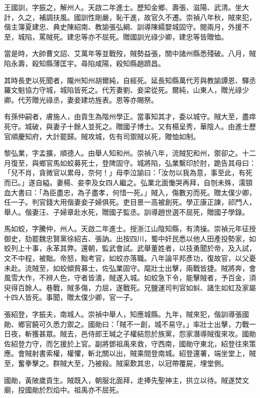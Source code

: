 \begin{pinyinscope}
王國訓，字振之，解州人。天啟二年進士。歷知金鄉、壽張、滋陽、武清。坐大計，久之，補調扶風。國訓性剛嚴，恥干進，故官久不遷。崇禎八年秋，賊來犯，偕主簿夏建忠、典史陳紹南、教諭張弘綱、訓導陳繻嬰城固守。閱兩月，外援不至，城陷，罵賊死。建忠等亦不屈死。贈國訓光祿少卿，建忠等皆贈恤。

當是時，大帥曹文詔、艾萬年等並戰歿，賊勢益張，關中諸州縣悉殘破。八月，賊陷永壽，殺知縣薄匡宇。尋陷咸陽，殺知縣趙躋昌。

其時長吏以死聞者，隴州知州胡爾純，自經死。延長知縣萬代芳與教諭譚恩、驛丞羅文魁協力守城，城陷皆死之。代芳妻劉、妾梁從死。爾純，山東人，贈光祿少卿。代芳贈光祿丞，妻妾建坊旌表。恩等亦賜祭。

有孫仲嗣者，膚施人，由貢生為階州學正。當事知其才，委以城守。賊大至，盡瘁死守。城破，與妻子十餘人並死之。贈國子博士。又有楊呈秀，華陰人。由進士歷官順慶知府，大計罷歸。賊攻城，佐有司禦賊以死，贈恤如制。

黎弘業，字孟擴，順德人。由舉人知和州。崇禎八年，流賊犯和州，禦卻之。十二月復至，與鄉官馬如蛟募死士，登陴固守。城將陷，弘業繫印於肘，跪告其母曰：「兒不肖，貪微官以累母，奈何！」母李泣諭曰：「汝勿以我為意，事至此，有死而已。」遂自縊。妻楊、妾李及女四人繼之。弘業北面慟哭再拜，自刎未殊，濡頸血大書曰：「為臣盡忠，為子盡孝，何惜一死。」賊入，傷數刃而死。贈太僕少卿，任一子。判官錢大用偕妻妾子婦俱死。吏目景一高被創死。學正康正諫，祁門人，舉人。偕妻汪、子婦章赴水死，贈國子監丞。訓導趙世選不屈死，贈國子學錄。

馬如蛟，字騰仲，州人。天啟二年進士。授浙江山陰知縣，有清操。崇禎元年征授御史，劾罷魏忠賢黨徐紹吉、張訥。出按四川，蜀中奸民悉以他人田產投勢家，如蛟列上十事，永革其弊。還朝，監武會試。武舉董姓者，以技勇聞於帝，及入試，文不中程，被黜。帝怒，黜考官，如蛟亦落職。八年論平邦彥功，復故官，以父憂未赴。流賊至，如蛟傾貲募士，佐弘業固守。麾壯士出擊，兩戰皆捷。賊將奔，會風雪大作，不辨人色，守者皆潰，賊遂入城。如蛟急下令，能擊賊者，予百金，須臾得百餘人。巷戰，賊多傷，力屈，遂戰死。兄鹽運司判官如虯、諸生如虹及家屬十四人皆死。事聞，贈太僕少卿，官一子。

張紹登，字振夫，南城人。崇禎中舉人，知應城縣。九年，賊來犯，偕訓導張國勛、鄉官饒可久悉力禦之。國勛曰：「賊不一創，城不易守。」率壯士出擊，力戰一日夜，斬獲甚眾。賊去，邑侍郎王瑊之子權結怨於族黨，怨家潛導賊復來攻。國勛佐紹登力守，而乞援於上官。副將鄧祖禹來救，守西南，國勛守東北，紹登往來策應。會賊射書索權，權懼，斬北關以出，賊乘間登南城。紹登還署，端坐堂上，賊至，奮拳擊之。群賊大至，乃被殺。賊渠歎其忠，以冠帶覆屍，埋堂側。

國勛，黃陂歲貢生。賊既入，朝服北面拜，走捧先聖神主，拱立以待。賊遂焚文廟，投國勛於烈焰中。祖禹亦不屈死。


\end{pinyinscope}
